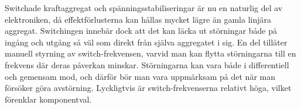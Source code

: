 Switchade kraftaggregat och spänningsstabiliseringar är nu en naturlig del
av elektroniken, då effektförlusterna kan hållas mycket lägre än gamla
linjära aggregat. Switchingen innebär dock att det kan läcka ut störningar
både på ingång och utgång så väl som direkt från själva aggregatet i sig.
En del tillåter manuell styrning av switch-frekvensen, varvid man kan flytta
störningarna till en frekvens där deras påverkan minskar. Störningarna kan vara
både i differentiell och gemensam mod, och därför bör man vara uppmärksam på det när
man försöker göra avstörning. Lyckligtvis är switch-frekvenserna relativt höga,
vilket förenklar komponentval.
